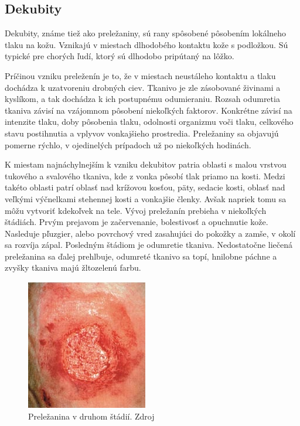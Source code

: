 \subsection{Dekubity}
Dekubity, známe tiež ako preležaniny, sú rany spôsobené pôsobením lokálneho tlaku na kožu. Vznikajú v miestach dlhodobého kontaktu kože s podložkou. Sú typické pre chorých ľudí, ktorý sú dlhodobo pripútaný na lôžko.

Príčinou vzniku preleženín je to, že v miestach neustáleho kontaktu a tlaku dochádza k uzatvoreniu drobných ciev. Tkanivo je zle zásobované živinami a kyslíkom, a tak dochádza k ich postupnému odumieraniu. Rozsah odumretia tkaniva závisí na vzájomnom pôsobení niekoľkých faktorov. Konkrétne závisí na intenzite tlaku, doby pôsobenia tlaku, odolnosti organizmu voči tlaku, celkového stavu postihnutia a vplyvov vonkajšieho prostredia. Preležaniny sa objavujú pomerne rýchlo, v ojedinelých prípadoch už po niekoľkých hodinách.

K miestam najnáchylnejším k vzniku dekubitov patria oblasti s malou vrstvou tukového a svalového tkaniva, kde z vonka pôsobí tlak priamo na kosti. Medzi takéto oblasti patrí oblasť nad krížovou kosťou, päty, sedacie kosti, oblasť nad veľkými výčnelkami stehennej kosti a vonkajšie členky. Avšak napriek tomu sa môžu vytvoriť kdekoľvek na tele. Vývoj preležanín prebieha v niekoľkých štádiách. Prvým prejavom je začervenanie, bolestivosť a opuchnutie kože. Nasleduje pľuzgier, alebo povrchový vred zasahujúci do pokožky a zamše, v okolí sa rozvíja zápal. Posledným štádiom je odumretie tkaniva. Nedostatočne liečená preležanina sa ďalej prehlbuje, odumreté tkanivo sa topí, hnilobne páchne a zvyšky tkaniva majú žltozelenú farbu.
\begin{figure}[h]
  \centering
  \includegraphics[scale=1]{fig/dekubit.png}
  \caption{Preležanina v druhom štádií. Zdroj \cite{Vilimovsky2015}}
  \label{fig:dekubit}
\end{figure}

